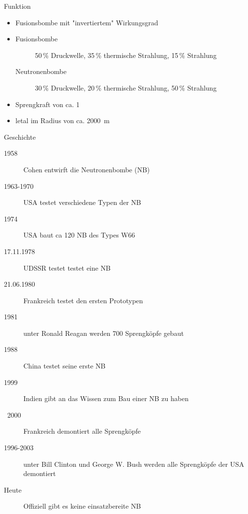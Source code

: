 \begin{frame}{Funktion}
	\begin{itemize}
		\item Fusionsbombe mit "invertiertem" Wirkungsgrad
		\item \begin{description}
						\item[Fusionsbombe] 50\,\% Druckwelle, 35\,\% thermische Strahlung, 15\,\% Strahlung
						\item[Neutronenbombe] 30\,\% Druckwelle, 20\,\% thermische Strahlung, 50\,\% Strahlung
					\end{description}
		\item Sprengkraft von ca. \SI{1}{\kilo \tnt}
		\item letal im Radius von ca. \SI{2000}{\meter}
	\end{itemize}
\end{frame}
\begin{frame}{Geschichte}
	\begin{description}
		\item[1958] Cohen entwirft die Neutronenbombe (NB)
		\item[1963-1970] USA testet verschiedene Typen der NB
		\item[1974] USA baut ca 120 NB des Types W66
		\item[17.11.1978] UDSSR testet testet eine NB
		\item[21.06.1980] Frankreich testet den ersten Prototypen
		\item[1981] unter Ronald Reagan werden 700 Sprengköpfe gebaut
		\item[1988] China testet seine erste NB
		\item[1999] Indien gibt an das Wissen zum Bau einer NB zu haben
		\item[~2000] Frankreich demontiert alle Sprengköpfe
		\item[1996-2003] unter Bill Clinton und George W. Bush werden alle Sprengköpfe der USA demontiert
		\item[Heute] Offiziell gibt es keine einsatzbereite NB
	\end{description}
\end{frame}
